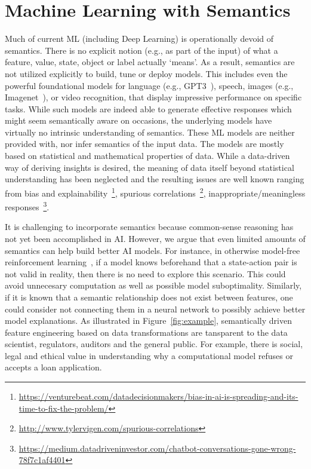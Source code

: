 \documentclass[sigconf, nonacm]{acmart}
\begin{document}
\section{Machine Learning with Semantics}
\label{ml_section}
Much of current ML (including Deep Learning) is operationally devoid of semantics. There is no explicit notion (e.g., as part of the input) of what a feature, value, state, object or label actually `means'. As a result, semantics are not utilized explicitly to build, tune or deploy models.
This includes even the powerful foundational models for language (e.g., GPT3~\cite{gpt3}), speech, images (e.g., Imagenet~\cite{imagenet}), or video recognition, that display impressive performance on specific tasks.
While such models are indeed able to generate effective responses which might seem semantically aware on occasions, the underlying models have virtually no intrinsic understanding of semantics. These ML models are neither provided with, nor infer semantics of the input data. The models are mostly based on statistical and mathematical properties of data. While a data-driven way of deriving insights is desired, the meaning of data itself beyond statistical understanding has been neglected and the resulting issues are well known ranging from bias and explainability~\footnote{\url{https://venturebeat.com/datadecisionmakers/bias-in-ai-is-spreading-and-its-time-to-fix-the-problem/}}, spurious correlations~\footnote{\url{http://www.tylervigen.com/spurious-correlations}}, inappropriate/meaningless responses~\footnote{\url{https://medium.datadriveninvestor.com/chatbot-conversations-gone-wrong-78f7c1af4401}}. 

It is challenging to incorporate semantics because common-sense reasoning has not yet been accomplished in AI. However, we argue that even limited amounts of semantics can help build better AI models. For instance, in otherwise model-free reinforcement learning~\cite{Sutton1998}, if a model knows beforehand that a state-action pair is not valid in reality, then there is no need to explore this scenario. This could avoid unnecesary computation as well as possible model suboptimality. %
Similarly, if it is known that a semantic relationship does not exist between features, one could consider not connecting them in a neural network to possibly achieve better model explanations. As illustrated in Figure~\ref{fig:example}, semantically driven feature engineering based on data transformations are tansparent to the data scientist, regulators, auditors and the general public. For example, there is social, legal and ethical value in understanding why a computational model refuses or accepts a loan application. 
\end{document}
